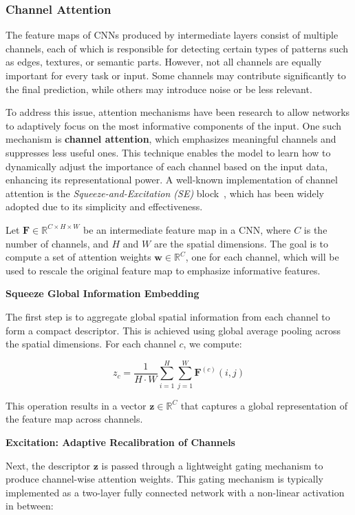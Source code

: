 \subsubsection{Channel Attention}
The feature maps of CNNs produced by intermediate layers consist of multiple channels, each of which is responsible for detecting certain types of patterns such as edges, textures, or semantic parts. However, not all channels are equally important for every task or input. Some channels may contribute significantly to the final prediction, while others may introduce noise or be less relevant. 

To address this issue, attention mechanisms have been research to allow networks to adaptively focus on the most informative components of the input. One such mechanism is \textbf{channel attention}, which emphasizes meaningful channels and suppresses less useful ones. This technique enables the model to learn how to dynamically adjust the importance of each channel based on the input data, enhancing its representational power. A well-known implementation of channel attention is the \textit{Squeeze-and-Excitation (SE)} block~\cite{hu2018squeeze}, which has been widely adopted due to its simplicity and effectiveness.

Let \( \mathbf{F} \in \mathbb{R}^{C \times H \times W} \) be an intermediate feature map in a CNN, where \( C \) is the number of channels, and \( H \) and \( W \) are the spatial dimensions. The goal is to compute a set of attention weights \( \mathbf{w} \in \mathbb{R}^{C} \), one for each channel, which will be used to rescale the original feature map to emphasize informative features.

\textbf{Squeeze Global Information Embedding}

The first step is to aggregate global spatial information from each channel to form a compact descriptor. This is achieved using global average pooling across the spatial dimensions. For each channel \( c \), we compute:

\[
z_c = \frac{1}{H \cdot W} \sum_{i=1}^{H} \sum_{j=1}^{W} \mathbf{F}^{(c)}(i,j)
\]

This operation results in a vector \( \mathbf{z} \in \mathbb{R}^{C} \) that captures a global representation of the feature map across channels.

\textbf{Excitation: Adaptive Recalibration of Channels}

Next, the descriptor \( \mathbf{z} \) is passed through a lightweight gating mechanism to produce channel-wise attention weights. This gating mechanism is typically implemented as a two-layer fully connected network with a non-linear activation in between:

